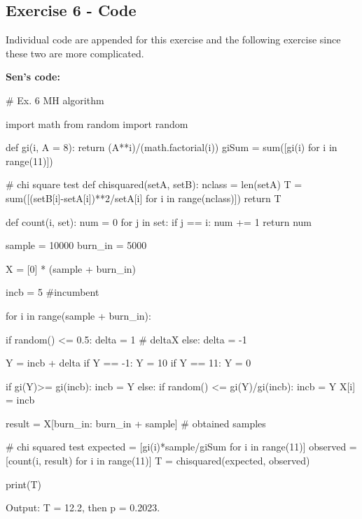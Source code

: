 \subsection*{Exercise 6 - Code}
Individual code are appended for this exercise and the following exercise since these two are more complicated. 

\textbf{Sen's code:}
\begin{python}
# Ex. 6 MH algorithm

import math
from random import random

def gi(i, A = 8):
    return (A**i)/(math.factorial(i))
giSum = sum([gi(i) for i in range(11)]) 

# chi square test
def chisquared(setA, setB):
    nclass = len(setA)
    T = sum([(setB[i]-setA[i])**2/setA[i] for i in range(nclass)])
    return T

def count(i, set):
    num = 0
    for j in set:
        if j == i:
            num += 1
    return num

sample = 10000
burn_in = 5000

X = [0] * (sample + burn_in)

incb = 5 #incumbent

for i in range(sample + burn_in):
    
    if random() <= 0.5:
        delta = 1 # deltaX
    else:
        delta = -1
    
    Y = incb + delta
    if Y == -1:
        Y = 10
    if Y == 11:
        Y = 0
        
    if gi(Y)>= gi(incb):
        incb = Y
    else:
        if random() <= gi(Y)/gi(incb):
            incb = Y
    X[i] = incb

result = X[burn_in: burn_in + sample] # obtained samples

# chi squared test
expected = [gi(i)*sample/giSum for i in range(11)]
observed = [count(i, result) for i in range(11)]
T = chisquared(expected, observed)

print(T)

\end{python}
Output: T = 12.2, then p = 0.2023.

